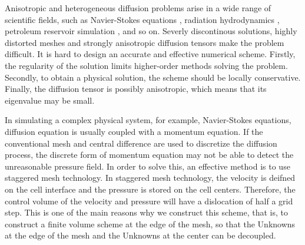 \documentclass[times,review,preprint,authoryear]{elsarticle}
\begin{document}
Anisotropic and heterogeneous diffusion problems arise in a wide range of scientific fields, such as Navier-Stokes equations \cite{???}, radiation hydrodynamics \cite{???}, petroleum reservoir simulation \cite{???}, and so on.
Severly discontinous solutions, highly distorted meshes and strongly anisotropic diffusion tensors make the problem difficult. It is hard to design an accurate and effective numerical scheme. Firstly, the regularity of the solution limits higher-order methods solving the problem. Secondly, to obtain a physical solution, the scheme should be locally conservative. Finally, the diffusion tensor is possibly anisotropic, which means that its eigenvalue may be small.

In simulating a complex physical system, for example, Navier-Stokes equations, diffusion equation is usually coupled with a momentum equation. If the conventional mesh and central difference are used to discretize the diffusion process, the discrete form of momentum equation may not be able to detect the unreasonable pressure field. In order to solve this, an effective method is to use staggered mesh technology. In staggered mesh technology, the velocity is deifned on the cell interface and the pressure is stored on the cell centers. Therefore, the control volume of the velocity and pressure will have a dislocation of half a grid step. This is one of the main reasons why we construct this scheme, that is, to construct a finite volume scheme at the edge of the mesh, so that the Unknowns at the edge of the mesh and the Unknowns at the center can be decoupled.
\end{document}
